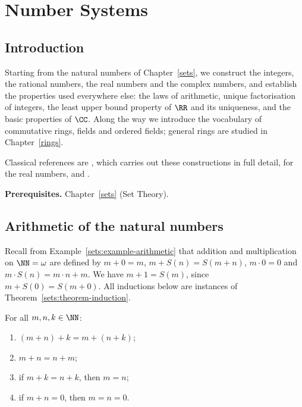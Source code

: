 \chapter{Number Systems}\label{number-systems}

\section{Introduction}\label{number-systems:section-introduction}

Starting from the natural numbers of Chapter~\ref{sets}, we construct the
integers, the rational numbers, the real numbers and the complex numbers, and
establish the properties used everywhere else: the laws of arithmetic, unique
factorisation of integers, the least upper bound property of $\RR$ and its
uniqueness, and the basic properties of $\CC$. Along the way we introduce the
vocabulary of commutative rings, fields and ordered fields; general rings are
studied in Chapter~\ref{rings}.

Classical references are \cite{landau-grundlagen}, which carries out these
constructions in full detail, \cite{dedekind-1872} for the real numbers, and
\cite[Chapter 1]{rudin-principles}.

\noindent\textbf{Prerequisites.} Chapter~\ref{sets} (Set Theory).

\section{Arithmetic of the natural numbers}\label{number-systems:section-natural-numbers}

Recall from Example~\ref{sets:example-arithmetic} that addition and
multiplication on $\NN = \omega$ are defined by $m + 0 = m$,
$m + S(n) = S(m + n)$, $m \cdot 0 = 0$ and $m \cdot S(n) = m \cdot n + m$. We have
$m + 1 = S(m)$, since $m + S(0) = S(m + 0)$. All inductions below are instances of
Theorem~\ref{sets:theorem-induction}.

\begin{proposition}\label{number-systems:proposition-addition}
For all $m, n, k \in \NN$:
\begin{enumerate}
\item $(m + n) + k = m + (n + k)$;
\item $m + n = n + m$;
\item if $m + k = n + k$, then $m = n$;
\item if $m + n = 0$, then $m = n = 0$.
\end{enumerate}
\end{proposition}

